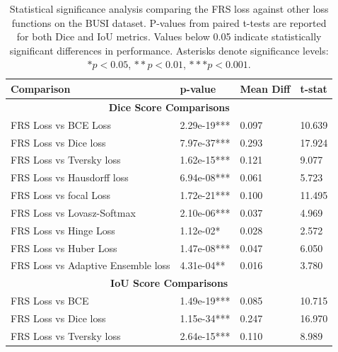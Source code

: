 \documentclass[review]{elsarticle}
\begin{document}
\begin{table}[ht]
	\caption{Statistical significance analysis comparing the FRS loss against other loss functions on the BUSI dataset. P-values from paired t-tests are reported for both Dice and IoU metrics. Values below 0.05 indicate statistically significant differences in performance. Asterisks denote significance levels: $* p < 0.05$, $** p < 0.01$, $*** p < 0.001$.}
	
	\label{table 7}
	\begin{tabular}{llll}
		\hline
		\textbf{Comparison}                & \textbf{p-value} & \textbf{Mean Diff} & \textbf{t-stat} \\
		\hline
		\multicolumn{4}{c}{\textbf{Dice Score Comparisons}}                                          \\
		\hline
		FRS Loss vs BCE Loss               & 2.29e-19***      & 0.097              & 10.639          \\
		FRS Loss vs Dice loss              & 7.97e-37***      & 0.293              & 17.924          \\
		FRS Loss vs Tversky loss           & 1.62e-15***      & 0.121              & 9.077           \\
		FRS Loss vs Hausdorff loss         & 6.94e-08***      & 0.061              & 5.723           \\
		FRS Loss vs focal Loss             & 1.72e-21***      & 0.100              & 11.495          \\
		FRS Loss vs Lovasz-Softmax         & 2.10e-06***      & 0.037              & 4.969           \\
		FRS Loss vs Hinge Loss             & 1.12e-02*        & 0.028              & 2.572           \\
		FRS Loss vs Huber Loss             & 1.47e-08***      & 0.047              & 6.050           \\
		FRS Loss vs Adaptive Ensemble loss & 4.31e-04**       & 0.016              & 3.780           \\
		\hline
		\multicolumn{4}{c}{\textbf{IoU Score Comparisons}}                                           \\
		\hline
		FRS Loss vs BCE                    & 1.49e-19***      & 0.085              & 10.715          \\
		FRS Loss vs Dice loss              & 1.15e-34***      & 0.247              & 16.970          \\
		FRS Loss vs Tversky loss           & 2.64e-15***      & 0.110              & 8.989           \\

\end{tabular}
\end{table}
\end{document}
